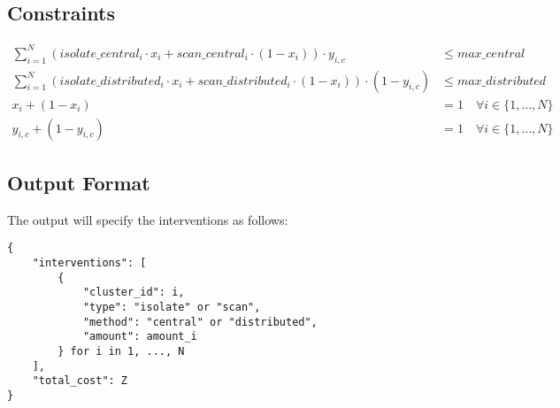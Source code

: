 \documentclass{article}
\begin{document}
\subsection*{Constraints}
\begin{align}
    \sum_{i=1}^{N} (isolate\_central_i \cdot x_i + scan\_central_i \cdot (1 - x_i)) \cdot y_{i, c} & \leq max\_central \\
    \sum_{i=1}^{N} (isolate\_distributed_i \cdot x_i + scan\_distributed_i \cdot (1 - x_i)) \cdot (1 - y_{i, c}) & \leq max\_distributed \\
    x_i + (1 - x_i) & = 1 \quad \forall i \in \{1, \ldots, N\} \\
    y_{i, c} + (1 - y_{i, c}) & = 1 \quad \forall i \in \{1, \ldots, N\}
\end{align}

\subsection*{Output Format}
The output will specify the interventions as follows:
\begin{verbatim}
{
    "interventions": [
        {
            "cluster_id": i,
            "type": "isolate" or "scan",
            "method": "central" or "distributed",
            "amount": amount_i
        } for i in 1, ..., N
    ],
    "total_cost": Z
}
\end{verbatim}
\end{document}
